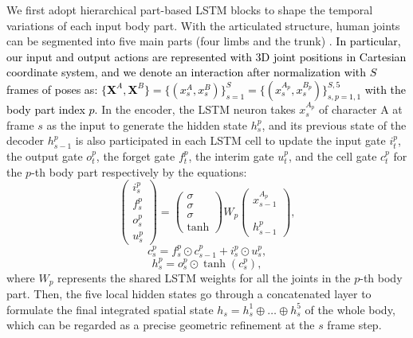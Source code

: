 \documentclass[times,twocolumn,final]{elsarticle}
\begin{document}
We first adopt hierarchical part-based LSTM blocks to shape the temporal variations of each input body part. With the articulated structure, human joints can be segmented into five main parts (four limbs and the trunk) \cite{si2018skeleton}. \textcolor{black}{In particular, our input and output actions are represented with 3D joint positions in Cartesian coordinate system, and we denote an interaction after normalization with $S$ frames of poses as: $\{\mathbf{X}^{A},\mathbf{X}^{B}\}=\{(x_{s}^{A},x_{s}^{B})\}_{s=1}^{S}=\{(x_{s}^{A_{p}},x_{s}^{B_{p}})\}_{s,p=1,1}^{S,5}$%
with the body part index $p$.} 
In the encoder, the LSTM neuron takes $x_{s}^{A_{p}}$ of character A at frame $s$ as the input to generate the hidden state $h_{s}^{p}$, and its previous state of the decoder $h_{s-1}^{p}$ is also participated in each LSTM cell to update the input gate $i_{t}^{p}$, the output gate $o_{t}^{p}$, the forget gate $f_{t}^{p}$, the interim gate $u_{t}^{p}$, and the cell gate $c_{t}^{p}$ for the $p$-th body part respectively by the equations:
\begin{equation}
\begin{pmatrix}i_{s}^{p}\\ f_{s}^{p}\\o_{s}^{p}\\u_{s}^{p}\end{pmatrix}=\begin{pmatrix}\sigma\\ \sigma\\\sigma\\\tanh\end{pmatrix}W_{p}\begin{pmatrix}x_{s-1}^{A_{p}}\\\\\\ h_{s-1}^{p}\end{pmatrix},
\end{equation}
\begin{equation}
c_{s}^{p}=f_{s}^{p}\odot c_{s-1}^{p}+i_{s}^{p}\odot u_{s}^{p},\label{eq:cell}
\end{equation}
\begin{equation}
h_{s}^{p}=o_{s}^{p}\odot\tanh(c_{s}^{p}),\label{eq:hidden}
\end{equation}
where $W_{p}$ represents the shared LSTM weights for all the joints in the $p$-th body part. Then, the five local hidden states go through a concatenated layer to formulate the final integrated spatial state $h_{s}=h_{s}^{1}\oplus\ldots\oplus h_{s}^{5}$ of the whole body, which can be regarded as a precise geometric refinement at the $s$ frame step.
\end{document}
